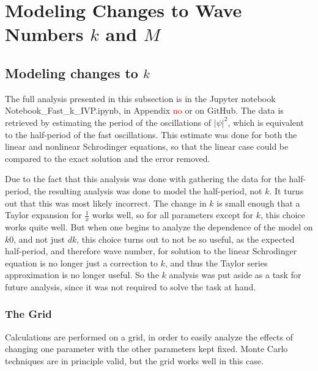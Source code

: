 \documentclass[A4,12pt,oneside]{article}
\renewcommand{\(}{\left(}
\renewcommand{\)}{\right)}
\newcommand{\refph}{\textcolor{red}{no }}
\begin{document}
\section{Modeling Changes to Wave Numbers $k$ and $M$}



\subsection{Modeling changes to $k$}

The full analysis presented in this subsection is in the Jupyter notebook\\ Notebook\_Fast\_k\_IVP.ipynb, in Appendix \refph or on GitHub. 
The data is retrieved by estimating the period of the oscillations of $\left|\psi\right|^2$, which is equivalent to the half-period of the fast oscillations. This estimate was done for both the linear and nonlinear Schrodinger equations, so that the linear case could be compared to the exact solution and the error removed. 

Due to the fact that this analysis was done with gathering the data for the half-period, the resulting analysis was done to model the half-period, not $k$. It turns out that this was most likely incorrect. The change in $k$ is small enough that a Taylor expansion for $\frac{1}{x}$ works well, so for all parameters except for $k$, this choice works quite well. But when one begins to analyze the dependence of the model on $k0$, and not just $dk$, this choice turns out to not be so useful, as the expected half-period, and therefore wave number, for solution to the linear Schrodinger equation is no longer just a correction to $k$, and thus the Taylor series approximation is no longer useful. So the $k$ analysis was put aside as a task for future analysis, since it was not required to solve the task at hand.

\subsubsection{The Grid}
Calculations are performed on a grid, in order to easily analyze the effects of changing one parameter with the other parameters kept fixed. Monte Carlo techniques are in principle valid, but the grid works well in this case.
\end{document}
